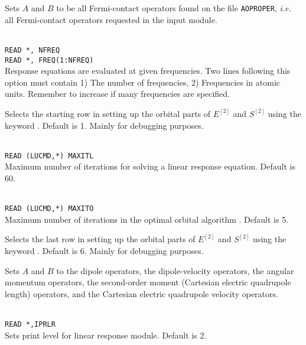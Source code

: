 \begin{description}
\item{} Sets $A$ and $B$ to be all Fermi-contact operators
  found on the file \verb|AOPROPER|, {\it i.e.\/} all Fermi-contact
  operators requested in the  input module.

\item{}\\
\verb|READ *, NFREQ|\\
\verb|READ *, FREQ(1:NFREQ)|\\
Response equations are evaluated at given
frequencies. Two lines following
this option must contain 1) The number of frequencies, 2) Frequencies
in atomic units.
Remember to increase  if many frequencies are specified.

\item{} Selects the starting row in setting up the orbital
  parts of $E^{\left[2\right]}$
  and $S^{\left[2\right]}$ using the keyword . Default is
  1. Mainly for debugging purposes.

\item{}\\
\verb|READ (LUCMD,*) MAXITL|\\
Maximum number of iterations for solving a linear response
equation. Default is 60.

\item{}\\
\verb|READ (LUCMD,*) MAXITO|\\
Maximum number of iterations in the optimal orbital
algorithm
\cite{tuhjahjajpjjcp84}.
Default is 5.

\item{} Selects the last row in setting up the orbital
  parts of $E^{\left[2\right]}$
  and $S^{\left[2\right]}$ using the keyword . Default is
  6. Mainly for debugging purposes.

\item{}
Sets $A$ and $B$ to the dipole operators,
the dipole-velocity operators,
the angular momentum operators,
the second-order moment (Cartesian electric quadrupole
length) operators, and
the Cartesian electric quadrupole velocity operators.

\item{}\\
\verb|READ *,IPRLR|\\
Sets print level for linear response module. Default is 2.


\end{description}
